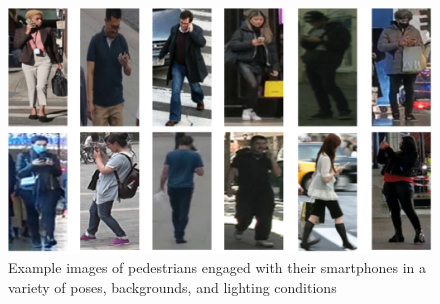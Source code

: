 \documentclass[journal]{IEEEtran}
\begin{document}
\begin{figure}
  \centering
  \includegraphics[width=0.8\columnwidth]{phone}
  \caption{Example images of pedestrians engaged with their smartphones in a variety of poses, backgrounds, and lighting conditions}
  \label{smato_true}
\end{figure}
\end{document}

